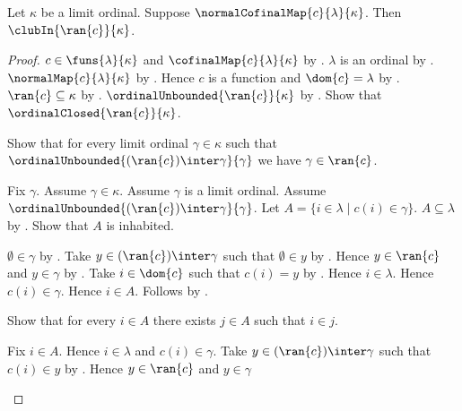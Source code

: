 \begin{theorem}\label{normal_cofinal_map_range_is_club}
    Let $\kappa$ be a limit ordinal.
    Suppose $\normalCofinalMap{c}{\lambda}{\kappa}$.
    Then $\clubIn{\ran{c}}{\kappa}$.
\end{theorem}
\begin{proof}
    $c\in\funs{\lambda}{\kappa}$ and
        $\cofinalMap{c}{\lambda}{\kappa}$
        by .
    $\lambda$ is an ordinal by .
    $\normalMap{c}{\lambda}{\kappa}$
        by .
    Hence $c$ is a function and $\dom{c}=\lambda$
        by .
    $\ran{c}\subseteq\kappa$ by .
    $\ordinalUnbounded{\ran{c}}{\kappa}$
        by .
    Show that $\ordinalClosed{\ran{c}}{\kappa}$.
    \begin{subproof}
        Show that for every limit ordinal $\gamma\in\kappa$ such that
            $\ordinalUnbounded{(\ran{c})\inter\gamma}{\gamma}$
            we have $\gamma\in\ran{c}$.
        \begin{subproof}
            Fix $\gamma$.
            Assume $\gamma\in\kappa$.
            Assume $\gamma$ is a limit ordinal.
            Assume $\ordinalUnbounded{(\ran{c})\inter\gamma}{\gamma}$.
            Let $A=\{i\in\lambda\mid c(i)\in\gamma\}$.
            $A\subseteq\lambda$ by .
            Show that $A$ is inhabited.
            \begin{subproof}
                $\emptyset\in\gamma$ by .
                Take $y\in(\ran{c})\inter\gamma$ such that
                    $\emptyset\in y$ by .
                Hence $y\in\ran{c}$ and $y\in\gamma$
                    by .
                Take $i\in\dom{c}$ such that $c(i)=y$
                    by .
                Hence $i\in\lambda$.
                Hence $c(i)\in\gamma$.
                Hence $i\in A$.
                Follows by \auto.
            \end{subproof}
            Show that for every $i\in A$ there exists $j\in A$ such that
                $i\in j$.
            \begin{subproof}
                Fix $i\in A$.
                Hence $i\in\lambda$ and $c(i)\in\gamma$.
                Take $y\in(\ran{c})\inter\gamma$ such that $c(i)\in y$
                    by .
                Hence $y\in\ran{c}$ and $y\in\gamma$

\end{subproof}
\end{subproof}
\end{subproof}
\end{proof}
